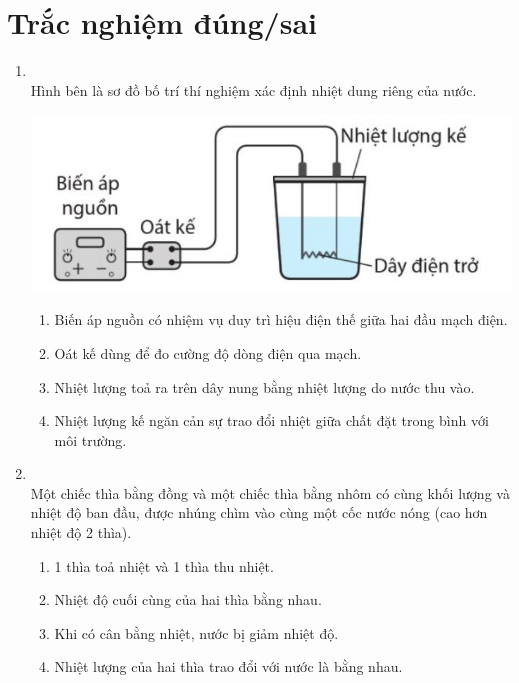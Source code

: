 \section{Trắc nghiệm đúng/sai}
\begin{enumerate}[label=\bfseries Câu \arabic*:, leftmargin=1.7cm]
	\item {}\\
	Hình bên là sơ đồ bố trí thí nghiệm xác định nhiệt dung riêng của nước.
	\begin{center}
		\includegraphics[width=0.45\linewidth]{../figs/VN12-Y24-PH-SYL-004P-3}
	\end{center}
\begin{enumerate}[label=\alph*)]
	\item Biến áp nguồn có nhiệm vụ duy trì hiệu điện thế giữa hai đầu mạch điện.
	\item Oát kế dùng để đo cường độ dòng điện qua mạch.
	\item Nhiệt lượng toả ra trên dây nung bằng nhiệt lượng do nước thu vào.
	\item Nhiệt lượng kế ngăn cản sự trao đổi nhiệt giữa chất đặt trong bình với môi trường.
\end{enumerate}

\item {}\\
Một chiếc thìa bằng đồng và một chiếc thìa bằng nhôm có cùng khối lượng và nhiệt độ ban đầu, được nhúng chìm vào cùng một cốc nước nóng (cao hơn nhiệt độ 2 thìa).
\begin{enumerate}[label=\alph*)]
	\item 1 thìa toả nhiệt và 1 thìa thu nhiệt.
	\item Nhiệt độ cuối cùng của hai thìa bằng nhau.
	\item Khi có cân bằng nhiệt, nước bị giảm nhiệt độ.
	\item Nhiệt lượng của hai thìa trao đổi với nước là bằng nhau.
\end{enumerate}
\end{enumerate}
